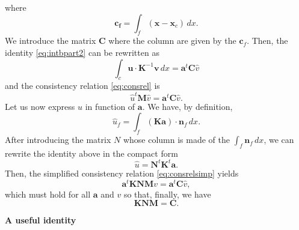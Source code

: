 \documentclass[11pt]{amsart}
\newcommand{\vect}[1]{\boldsymbol{#1}}
\newcommand{\mat}[1]{\boldsymbol{#1}}
\begin{document}
where
\begin{equation}
  \label{eq:defcf}
  \vect{c_f} = \int_{f}(\vect{x} - \vect{x}_c)\,dx.
\end{equation}
We introduce the matrix $\mat{C}$ where the column are given by the $\vect{c}_f$. Then, the identity
\eqref{eq:intbpart2} can be rewritten as
\begin{equation}
  \label{eq:intbpart3}
 \int_c\vect{u}\cdot\mat{K}^{-1}\vect{v}\,dx  = \vect{a}^t\mat{C}\hat{v}
\end{equation}
and the consistency relation \eqref{eq:consrel} is
\begin{equation}
  \label{eq:consrelsimp}
  \hat{u}^t\mat{M}\hat{v} = \vect{a}^t\mat{C}\hat{v}.
\end{equation}
Let us now express $\hat{u}$ in function of $\vect{a}$. We have, by definition,
\begin{equation*}
  \hat{u}_f = \int_f (\vect{K}\vect{a})\cdot \vect{n}_f\,dx.
\end{equation*}
After introducing the matrix $N$ whose column is made of the $\int_{f} \vect{n}_f\,dx$, we can
rewrite the identity above in the compact form
\begin{equation}
  \label{eq:relau}
  \hat{u} = \mat{N}^t\mat{K}^{t}\vect{a}.
\end{equation}
Then, the simplified consistency relation \eqref{eq:consrelsimp} yields
\begin{equation*}
  \vect{a}^t\mat{K}\mat{N}\mat{M}v = \vect{a}^t\mat{C}\hat{v},
\end{equation*}
which must hold for all $\vect{a}$ and $v$ so that, finally, we have
\begin{equation}
  \label{eq:consrelfin}
  \mat{K}\mat{N}\mat{M} = \mat{C}.
\end{equation}

\textbf{A useful identity}
\end{document}
